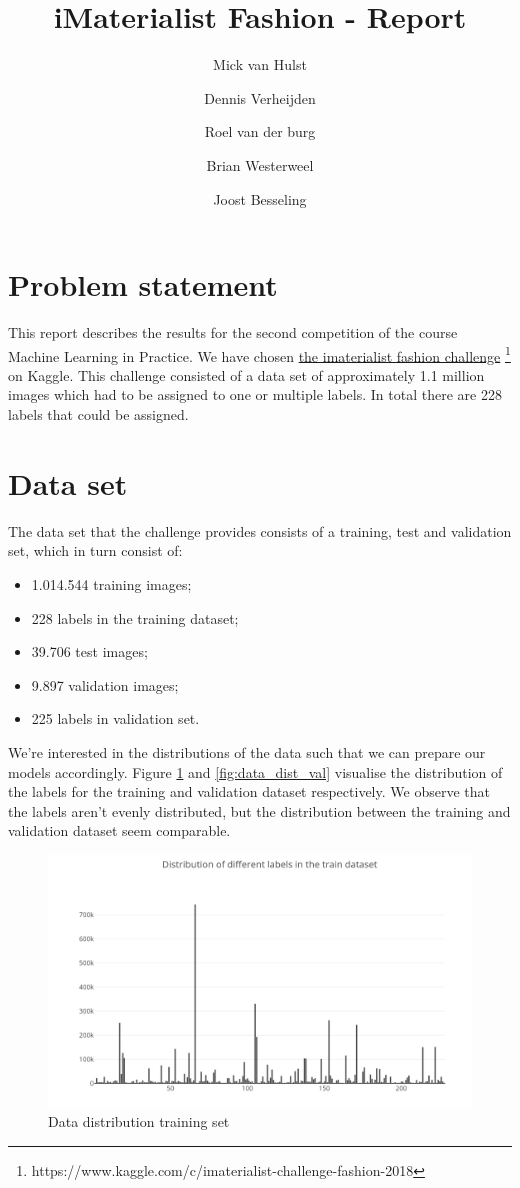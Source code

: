 \documentclass[twocolumn]{article}
\title{iMaterialist Fashion - Report}
\author{Mick van Hulst \and Dennis Verheijden \and Roel van der burg \and Brian Westerweel \and Joost Besseling}
\begin{document}
	\maketitle       
		\section{Problem statement}
       	This report describes the results for the second competition of the course Machine Learning in Practice.
		We have chosen \href{https://www.kaggle.com/c/imaterialist-challenge-fashion-2018}{the imaterialist fashion challenge} \footnote{https://www.kaggle.com/c/imaterialist-challenge-fashion-2018} on Kaggle. This challenge consisted of a data set of approximately 1.1 million images which had to be assigned to one or multiple labels. In total there are 228 labels that could be assigned.
		\section{Data set}
        The data set that the challenge provides consists of a training, test and validation set, which in turn consist of: 
        \begin{itemize}
            \item 1.014.544 training images;
            \item 228 labels in the training dataset;
            \item 39.706 test images;
            \item 9.897 validation images;
            \item 225 labels in validation set.
        \end{itemize}
        We're interested in the distributions of the data such that we can prepare our models accordingly. Figure \ref{fig:data_dist_train} and \ref{fig:data_dist_val} visualise the distribution of the labels for the training and validation dataset respectively. We observe that the labels aren't evenly distributed, but the distribution between the training and validation dataset seem comparable.
        \begin{figure}
            \centering
            \includegraphics[scale=.4]{img/dist_labels_train.PNG}
            \caption{Data distribution training set}
            \label{fig:data_dist_train}
        \end{figure}
        
\end{document}
